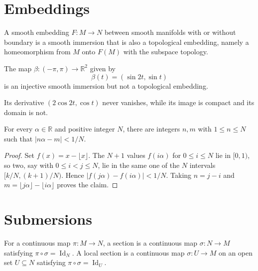 \section{Embeddings}

\begin{definition}
\label{def:4-24-extra-1}
\mathlibok
A smooth embedding $F:M\to N$ between smooth manifolds with or without boundary is a smooth immersion that is also a topological embedding, namely a homeomorphism from $M$ onto $F(M)$ with the subspace topology.
\end{definition}

\begin{example}
\label{ex:4-19}
\leanok
{}
The map $\beta:(-\pi,\pi)\to\mathbb R^2$ given by
\[
\beta(t)=(\sin 2t,\sin t)
\]
is an injective smooth immersion but not a topological embedding.

\sketch Its derivative $(2\cos 2t,\cos t)$ never vanishes, while its image is compact and its domain is not.
\end{example}

\begin{lemma}
\label{lem:4-21}
\leanok
{}
For every $\alpha\in\mathbb R$ and positive integer $N$, there are integers $n,m$ with $1\le n\le N$ such that $|n\alpha-m|<1/N$.
\end{lemma}

\begin{proof}
\leanok
\sketch
Set $f(x)=x-\lfloor x\rfloor$. The $N+1$ values $f(i\alpha)$ for $0\le i\le N$ lie in $[0,1)$, so two, say with $0\le i<j\le N$, lie in the same one of the $N$ intervals $[k/N,(k+1)/N)$. Hence $|f(j\alpha)-f(i\alpha)|<1/N$. Taking $n=j-i$ and $m=\lfloor j\alpha\rfloor-\lfloor i\alpha\rfloor$ proves the claim.
\end{proof}


\section{Submersions}

\begin{definition}
\label{def:4-25-extra-1}
\mathlibok
For a continuous map $\pi:M\to N$, a section is a continuous map $\sigma:N\to M$ satisfying $\pi\circ\sigma=\operatorname{Id}_N$. A local section is a continuous map $\sigma:U\to M$ on an open set $U\subseteq N$ satisfying $\pi\circ\sigma=\operatorname{Id}_U$.
\end{definition}


